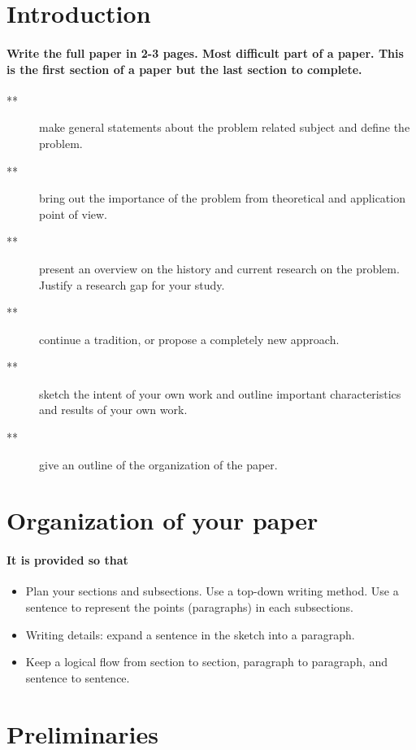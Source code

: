 \documentclass[20pt]{report}
\begin{document}
\section{Introduction}
\paragraph{ Write the full paper in 2-3 pages. Most difficult part of a paper.
This is the first section of a paper but the last section to
complete.}
\begin{description}
  \item[**   ] make general statements about the problem related
subject and define the problem.
\item[**   ] bring out the importance of the problem from theoretical
and application point of view.
\item[**  ] present an overview on the history and current research on
the problem. Justify a research gap for your study.
\item[**  ] continue a tradition, or propose a completely new
approach.
\item[**  ] sketch the intent of your own work and outline important
characteristics and results of your own work.
\item[**  ] give an outline of the organization of the paper.
\end{description}

\section{Organization of your paper}
\paragraph{It is provided so that}
\begin{itemize}
\item Plan your sections and subsections. Use a top-down
writing method. Use a sentence to represent the points
(paragraphs) in each subsections.
\item Writing details: expand a sentence in the sketch into a
paragraph.
\item Keep a logical flow from section to section, paragraph to
paragraph, and sentence to sentence.
\end{itemize}

\section{Preliminaries}
\end{document}
